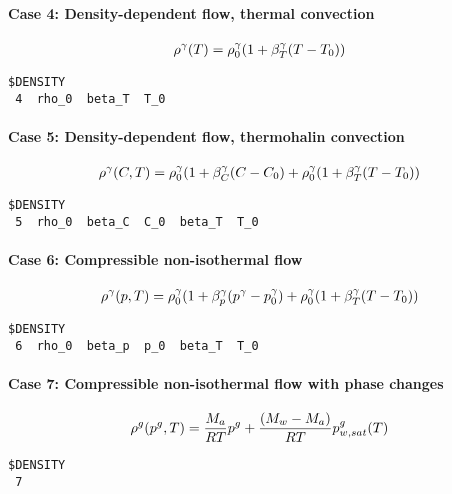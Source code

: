 \paragraph*{Case 4: Density-dependent flow, thermal convection}
\begin{eqnarray}
  \rho^\gamma(T)
  = \rho_0^\gamma(1+\beta_T^\gamma(T-T_0))
\end{eqnarray}
\begin{verbatim}
$DENSITY
 4  rho_0  beta_T  T_0
\end{verbatim}

\paragraph*{Case 5: Density-dependent flow, thermohalin convection}
\begin{eqnarray}
  \rho^\gamma(C,T)
  = \rho_0^\gamma(1+\beta_C^\gamma(C-C_0)
  + \rho_0^\gamma(1+\beta_T^\gamma(T-T_0))
\end{eqnarray}
\begin{verbatim}
$DENSITY
 5  rho_0  beta_C  C_0  beta_T  T_0
\end{verbatim}

\paragraph*{Case 6: Compressible non-isothermal flow}
\begin{eqnarray}
  \rho^\gamma(p,T)
  = \rho_0^\gamma(1+\beta_p^\gamma(p^\gamma-p^\gamma_0)
  + \rho_0^\gamma(1+\beta_T^\gamma(T-T_0))
\end{eqnarray}
\begin{verbatim}
$DENSITY
 6  rho_0  beta_p  p_0  beta_T  T_0
\end{verbatim}

\paragraph*{Case 7: Compressible non-isothermal flow with phase changes}
\begin{eqnarray}
  \rho^g(p^g,T)=
  \frac{M_a}{RT}p^g+\frac{(M_w -
  M_a)}{RT}p^g_{w,sat}(T)
\end{eqnarray}
\begin{verbatim}
$DENSITY
 7
\end{verbatim}


